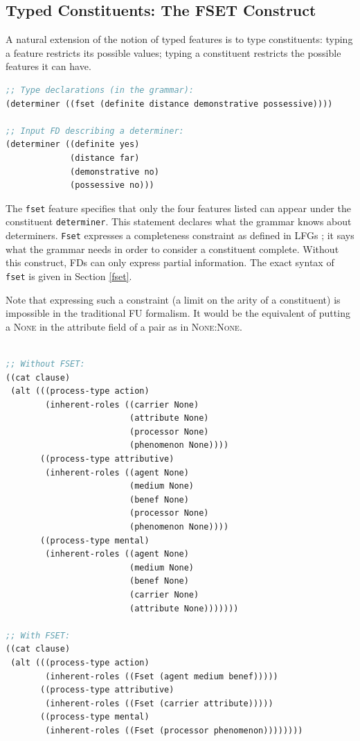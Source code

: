 \documentclass[10pt,a4paper]{report}
\begin{document}
\subsection{Typed Constituents: The FSET Construct}

A natural extension of the notion of typed features is to type
constituents: typing a feature restricts its possible values;
typing a constituent restricts the possible features it can have.

\begin{lstlisting}[language=Lisp]
;; Type declarations (in the grammar):
(determiner ((fset (definite distance demonstrative possessive))))

;; Input FD describing a determiner:
(determiner ((definite yes) 
			 (distance far) 
			 (demonstrative no) 
			 (possessive no)))
\end{lstlisting}

The {\tt fset} feature specifies that only the four features listed can appear
under the constituent {\tt determiner}.  This statement declares what the
grammar knows about determiners.  {\tt Fset} expresses a completeness
constraint as defined in LFGs \cite{KaplanBresnan}; it says what the
grammar needs in order to consider a constituent complete.  Without this
construct, FDs can only express partial information.
The exact syntax of {\tt fset} is given in Section \ref{fset}.

Note that expressing such a constraint (a limit on the arity of a
constituent) is impossible in the traditional FU formalism.  It would be
the equivalent of putting a \textsc{None} in the attribute field of a pair as in
\textsc{None:None}.


\begin{lstlisting}[language=Lisp]

;; Without FSET:
((cat clause)
 (alt (((process-type action)
        (inherent-roles ((carrier None)
                         (attribute None)
                         (processor None)
                         (phenomenon None))))
       ((process-type attributive)
        (inherent-roles ((agent None)
                         (medium None)
                         (benef None)
                         (processor None)
                         (phenomenon None))))
       ((process-type mental)
        (inherent-roles ((agent None)
                         (medium None)
                         (benef None)
                         (carrier None)
                         (attribute None)))))))
       
;; With FSET:
((cat clause)
 (alt (((process-type action)
        (inherent-roles ((Fset (agent medium benef)))))
       ((process-type attributive)
        (inherent-roles ((Fset (carrier attribute)))))
       ((process-type mental)
        (inherent-roles ((Fset (processor phenomenon))))))))

\end{lstlisting}
\end{document}
